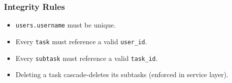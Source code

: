 \subsubsection{Integrity Rules}
\begin{itemize}
  \item \texttt{users.username} must be unique.
  \item Every \texttt{task} must reference a valid \texttt{user\_id}.
  \item Every \texttt{subtask} must reference a valid \texttt{task\_id}.
  \item Deleting a task cascade-deletes its subtasks (enforced in service layer).
\end{itemize}

\newpage
